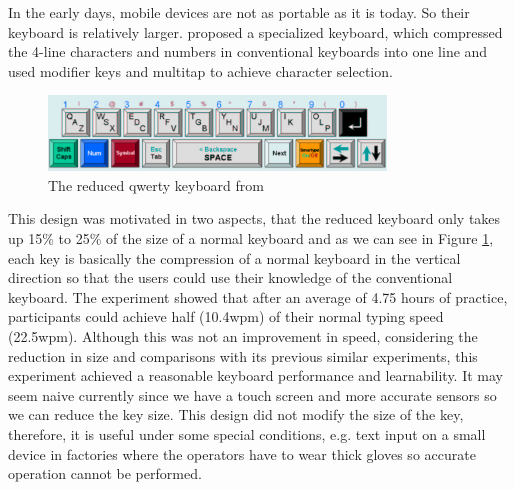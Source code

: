 \documentclass[11pt]{article}
\begin{document}
In the early days, mobile devices are not as portable as it is today. So their keyboard is relatively larger. \citet{10.1145/985921.986082} proposed a specialized keyboard, which compressed the 4-line characters and numbers in conventional keyboards into one line and used modifier keys and multitap to achieve character selection.
\begin{figure}[H]
  \centering
  \includegraphics[width=0.8\textwidth]{ReducedQWERTYKeyboard.png}
  \caption{The reduced qwerty keyboard from \citep{10.1145/985921.986082}}
  \label{fig:reducedKeyboard}
\end{figure}

This design was motivated in two aspects, that the reduced keyboard only takes up 15\% to 25\% of the size of a normal keyboard and as we can see in Figure \ref{fig:reducedKeyboard}, each key is basically the compression of a normal keyboard in the vertical direction so that the users could use their knowledge of the conventional keyboard. The experiment showed that after an average of 4.75 hours of practice, participants could achieve half (10.4wpm) of their normal typing speed (22.5wpm). Although this was not an improvement in speed, considering the reduction in size and comparisons with its previous similar experiments, this experiment achieved a reasonable keyboard performance and learnability. It may seem naive currently since we have a touch screen and more accurate sensors so we can reduce the key size. This design did not modify the size of the key, therefore, it is useful under some special conditions, e.g. text input on a small device in factories where the operators have to wear thick gloves so accurate operation cannot be performed. 
\end{document}
